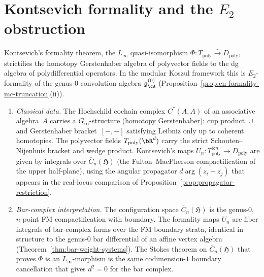 \section{Kontsevich formality and the \texorpdfstring{$E_2$}{E2} obstruction}
\label{sec:kontsevich-formality-rectification}

\begin{construction}
\label{constr:kontsevich-rectification}
Kontsevich's formality theorem, the $L_\infty$ quasi-isomorphism
$\Phi \colon T_{\mathrm{poly}} \xrightarrow{\sim} D_{\mathrm{poly}}$,
strictifies the homotopy Gerstenhaber algebra of polyvector fields to the dg
algebra of polydifferential operators. In the modular Koszul framework this is
$E_2$-formality of the genus-$0$ convolution algebra $\mathfrak{g}^{(0)}_\cA$
(Proposition~\ref{prop:en-formality-mc-truncation}\textup{(ii)}).
\begin{enumerate}[label=\textup{(\roman*)}]
\item \emph{Classical data.}
 The Hochschild cochain complex $C^*(A,A)$ of an associative
 algebra~$A$ carries a $G_\infty$-structure (homotopy
 Gerstenhaber): cup product~$\cup$ and Gerstenhaber
 bracket~$[-,-]$ satisfying Leibniz only up to coherent
 homotopies. The polyvector fields $T_{\mathrm{poly}}(\bR^d)$
 carry the strict Schouten--Nijenhuis bracket and wedge product.
 Kontsevich's maps $U_n \colon T_{\mathrm{poly}}^{\otimes n}
 \to D_{\mathrm{poly}}$ are given by integrals over
 $\overline{C}_n(\mathfrak{H})$ (the Fulton--MacPherson
 compactification of the upper half-plane), using the angular
 propagator $d\arg(z_i-z_j)$ that appears in the real-locus
 comparison of Proposition~\ref{prop:propagator-restriction}.
\item \emph{Bar-complex interpretation.}
 The configuration space
 $\overline{C}_n(\mathfrak{H})$ is the genus-$0$, $n$-point FM
 compactification with boundary. The formality maps $U_n$ are
 fiber integrals of bar-complex forms over the FM boundary
 strata, identical in structure to the genus-$0$ bar differential
 of an affine vertex algebra
 (Theorem~\ref{thm:bar-weight-systems}). The Stokes theorem on
 $\overline{C}_n(\mathfrak{H})$ that proves $\Phi$ is an
 $L_\infty$-morphism is the same codimension-$1$ boundary
 cancellation that gives $d^2 = 0$ for the bar complex.

\end{enumerate}
\end{construction}
